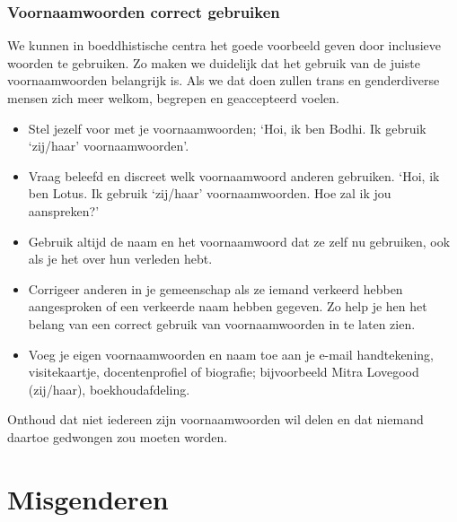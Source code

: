 \documentclass[12pt,openany]{book}
\begin{document}
\subsubsection*{Voornaamwoorden correct gebruiken}

We kunnen in boeddhistische centra het goede voorbeeld geven door inclusieve woorden te gebruiken. Zo maken we duidelijk dat het gebruik van de juiste voornaamwoorden belangrijk is. Als we dat doen zullen trans en genderdiverse mensen zich meer welkom, begrepen en geaccepteerd voelen.

\begin{itemize}
\setlength\itemsep{-0.3em}
\item Stel jezelf voor met je voornaamwoorden; `Hoi, ik ben Bodhi. Ik gebruik `zij/haar' voornaamwoorden'. 
\item Vraag beleefd en discreet welk voornaamwoord anderen gebruiken. `Hoi, ik ben Lotus. Ik gebruik `zij/haar' voornaamwoorden. Hoe zal ik jou aanspreken?' 
\item Gebruik altijd de naam en het voornaamwoord dat ze zelf nu gebruiken, ook als je het over hun verleden hebt.
\item Corrigeer anderen in je gemeenschap als ze iemand verkeerd hebben aangesproken of een verkeerde naam hebben gegeven. Zo help je hen het belang van een correct gebruik van voornaamwoorden in te laten zien.
\item Voeg je eigen voornaamwoorden en naam toe aan je e-mail handtekening, visitekaartje, docentenprofiel of biografie; bijvoorbeeld Mitra Lovegood (zij/haar), boekhoudafdeling.
\end{itemize}\begin{figure}[h]
    \centering
\end{figure}

Onthoud dat niet iedereen zijn voornaamwoorden wil delen en dat niemand daartoe gedwongen zou moeten worden. 

\section*{Misgenderen}
\end{document}

